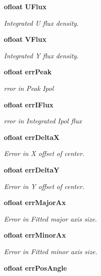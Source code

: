 \begin{CompactItemize}
{\bf ofloat} {\bf UFlux}
\begin{CompactList}\small\item\em Integrated U flux density. \item\end{CompactList}\item 
{\bf ofloat} {\bf VFlux}
\begin{CompactList}\small\item\em Integrated Y flux density. \item\end{CompactList}\item 
{\bf ofloat} {\bf err\-Peak}
\begin{CompactList}\small\item\em rror in Peak Ipol \item\end{CompactList}\item 
{\bf ofloat} {\bf err\-IFlux}
\begin{CompactList}\small\item\em rror in Integrated Ipol flux \item\end{CompactList}\item 
{\bf ofloat} {\bf err\-Delta\-X}
\begin{CompactList}\small\item\em Error in X offset of center. \item\end{CompactList}\item 
{\bf ofloat} {\bf err\-Delta\-Y}
\begin{CompactList}\small\item\em Error in Y offset of center. \item\end{CompactList}\item 
{\bf ofloat} {\bf err\-Major\-Ax}
\begin{CompactList}\small\item\em Error in Fitted major axis size. \item\end{CompactList}\item 
{\bf ofloat} {\bf err\-Minor\-Ax}
\begin{CompactList}\small\item\em Error in Fitted minor axis size. \item\end{CompactList}\item 
{\bf ofloat} {\bf err\-Pos\-Angle}

\end{CompactItemize}
